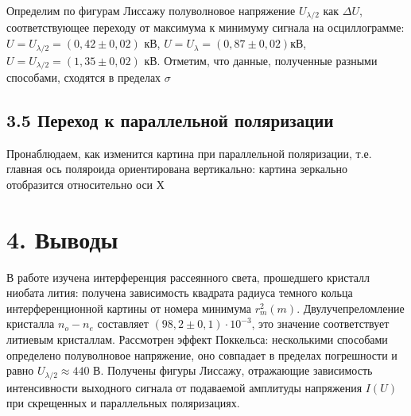 \documentclass[a4paper,12pt]{report}
\begin{document}
Определим по фигурам Лиссажу полуволновое напряжение $U_{\lambda/2}$ как $\Delta U$, соответствующее переходу от максимума к минимуму сигнала на осциллограмме:\\
$U = U_{\lambda/2} = (0,42\pm 0,02)$ кВ, $U = U_{\lambda} = (0,87\pm 0,02)$кВ,$U = U_{\lambda/2} = (1,35\pm 0,02)$ кВ.
Отметим, что данные, полученные разными способами, сходятся в пределах $\sigma$

\subsection*{3.5 Переход к параллельной поляризации}

Пронаблюдаем, как изменится картина при параллельной поляризации, т.е. главная ось поляроида ориентирована вертикально: картина зеркально отобразится относительно оси Х

\section*{4. Выводы}

В работе изучена интерференция рассеянного света, прошедшего кристалл ниобата лития: получена зависимость квадрата радиуса темного кольца интерференционной картины от номера минимума $r_m^2(m)$. Двулучепреломление кристалла $n_o - n_e$ составляет $(98,2 \pm 0,1)\cdot10^{-3}$, это значение соответствует литиевым кристаллам. 
Рассмотрен эффект Поккельса: несколькими способами определено полуволновое напряжение, оно совпадает в пределах погрешности и равно $U_{\lambda/2} \approx 440$ В. Получены фигуры Лиссажу, отражающие зависимость интенсивности выходного сигнала от подаваемой амплитуды напряжения $I(U)$ при скрещенных и параллельных поляризациях.
	
	
\end{document}
